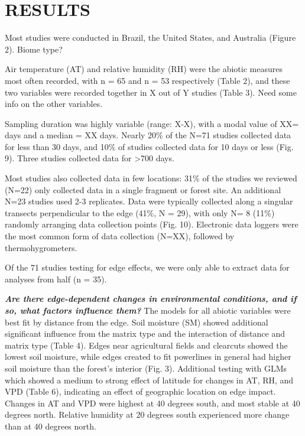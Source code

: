 \documentclass[
  man]{apa6}
\begin{document}
\section{RESULTS}\label{results}

Most studies were conducted in Brazil, the United States, and Australia (Figure 2). Biome type?

Air temperature (AT) and relative humidity (RH) were the abiotic measures most often recorded, with n = 65 and n = 53 respectively (Table 2), and these two variables were recorded together in X out of Y studies (Table 3). Need some info on the other variables.

Sampling duration was highly variable (range: X-X), with a modal value of XX= days and a median = XX days. Nearly 20\% of the N=71 studies collected data for less than 30 days, and 10\% of studies collected data for 10 days or less (Fig. 9). Three studies collected data for \textgreater700 days.

Most studies also collected data in few locations: 31\% of the studies we reviewed (N=22) only collected data in a single fragment or forest site. An additional N=23 studies used 2-3 replicates. Data were typically collected along a singular transects perpendicular to the edge (41\%, N = 29), with only N= 8 (11\%) randomly arranging data collection points (Fig. 10). Electronic data loggers were the most common form of data collection (N=XX), followed by thermohygrometers.

Of the 71 studies testing for edge effects, we were only able to extract data for analyses from half (n = 35).

\textbf{\emph{Are there edge-dependent changes in environmental conditions, and if so, what factors influence them?}} The models for all abiotic variables were best fit by distance from the edge. Soil moisture (SM) showed additional significant influence from the matrix type and the interaction of distance and matrix type (Table 4). Edges near agricultural fields and clearcuts showed the lowest soil moisture, while edges created to fit powerlines in general had higher soil moisture than the forest's interior (Fig. 3).
Additional testing with GLMs which showed a medium to strong effect of latitude for changes in AT, RH, and VPD (Table 6), indicating an effect of geographic location on edge impact. Changes in AT and VPD were highest at 40 degrees south, and most stable at 40 degrees north. Relative humidity at 20 degrees south experienced more change than at 40 degrees north.
\end{document}
